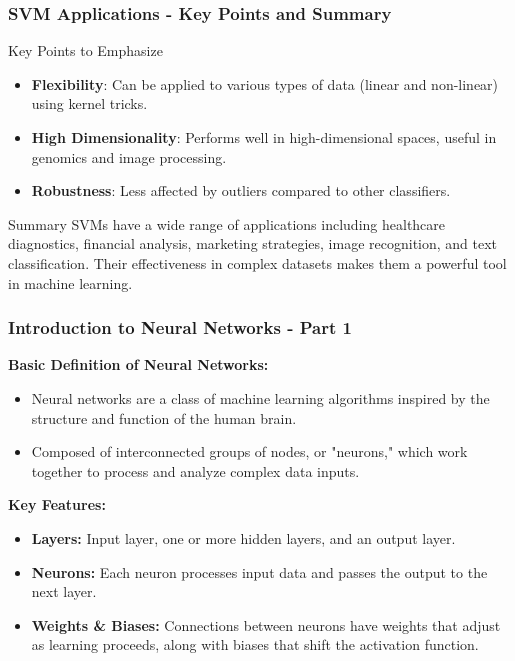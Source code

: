 \documentclass[aspectratio=169]{beamer}
\begin{document}
\begin{frame}[fragile]
    \frametitle{SVM Applications - Key Points and Summary}
    \begin{block}{Key Points to Emphasize}
        \begin{itemize}
            \item \textbf{Flexibility}: Can be applied to various types of data (linear and non-linear) using kernel tricks.
            \item \textbf{High Dimensionality}: Performs well in high-dimensional spaces, useful in genomics and image processing.
            \item \textbf{Robustness}: Less affected by outliers compared to other classifiers.
        \end{itemize}
    \end{block}

    \begin{block}{Summary}
        SVMs have a wide range of applications including healthcare diagnostics, financial analysis, marketing strategies, image recognition, and text classification. Their effectiveness in complex datasets makes them a powerful tool in machine learning. 
    \end{block}
\end{frame}

\begin{frame}[fragile]
    \frametitle{Introduction to Neural Networks - Part 1}
    \textbf{Basic Definition of Neural Networks:}
    \begin{itemize}
        \item Neural networks are a class of machine learning algorithms inspired by the structure and function of the human brain.
        \item Composed of interconnected groups of nodes, or "neurons," which work together to process and analyze complex data inputs.
    \end{itemize}
    
    \textbf{Key Features:}
    \begin{itemize}
        \item \textbf{Layers:} Input layer, one or more hidden layers, and an output layer.
        \item \textbf{Neurons:} Each neuron processes input data and passes the output to the next layer. 
        \item \textbf{Weights \& Biases:} Connections between neurons have weights that adjust as learning proceeds, along with biases that shift the activation function.
    \end{itemize}
\end{frame}
\end{document}
